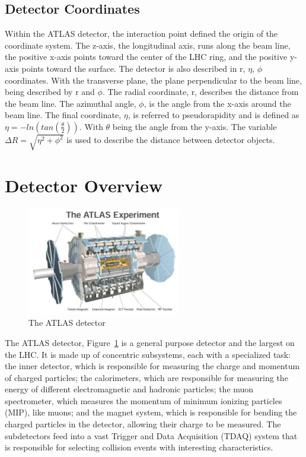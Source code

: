 \subsection{Detector Coordinates}
Within the ATLAS detector, the interaction point defined the origin of the coordinate system. The z-axis, the longitudinal axis, runs along the beam line, the positive x-axis points toward the center of the LHC ring, and the positive y-axis points toward the surface. The detector is also described in r, ${\eta}$, ${\phi}$ coordinates. With the transverse plane, the plane perpendicular to the beam line, being described by r and ${\phi}$. The radial coordinate, r, describes the distance from the beam line. The azimuthal angle, ${\phi}$, is the angle from the x-axis around the beam line. The final coordinate, ${\eta}$, is referred to pseudorapidity and is defined as ${\eta = -ln(tan(\frac{\theta}{2}))}$. With ${\theta}$ being the angle from the y-axis. The variable ${\Delta{R}=\sqrt{\eta^{2} + \phi^{2}}}$ is used to describe the distance between detector objects.
\section{Detector Overview}
\begin{figure}[h]
\begin{center}
\includegraphics*[width=0.60\textwidth] {figures/ATLAS_det}%
\caption[The ATLAS detector]{The ATLAS detector}
\label{fig:ATLAS_det}
\end{center}
\end{figure}
The ATLAS detector, Figure~\ref{fig:ATLAS_det} is a general purpose detector and the largest on the LHC.  It is made up of concentric subsystems, each with a specialized task: the inner detector, which is responsible for measuring the charge and momentum of charged particles; the calorimeters, which are responsible for measuring the energy of different electromagnetic and hadronic particles; the muon spectrometer, which measures the momentum of minimum ionizing particles (MIP), like muons; and the magnet system, which is responsible for bending the charged particles in the detector, allowing their charge to be measured. The subdetectors feed into a vast Trigger and Data Acquisition (TDAQ) system that is responsible for selecting collision events with interesting characteristics.

